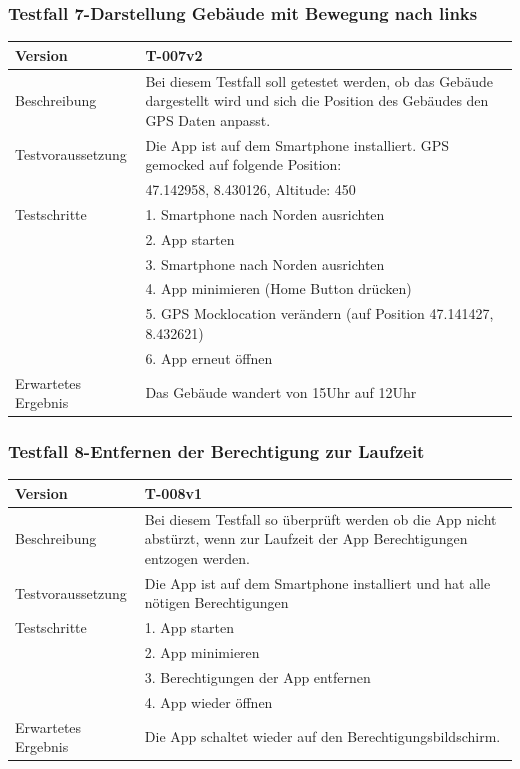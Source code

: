 \documentclass[a4paper]{scrreprt}
\begin{document}
\subsubsection{Testfall 7-Darstellung Gebäude mit Bewegung nach links}
\begin{tabularx}{\textwidth}{|l|X|}
\hline 
	Version &
	T-007v2 \\ 
\hline 
	Beschreibung & 
	Bei diesem Testfall soll getestet werden, ob das Gebäude dargestellt wird und sich die Position des Gebäudes den GPS Daten anpasst. \\ 
\hline 
	Testvoraussetzung &
	Die App ist auf dem Smartphone installiert. GPS gemocked auf folgende Position: \\ &
		47.142958, 8.430126, Altitude: 450 \\ 
\hline 
	Testschritte & 
		1. Smartphone nach Norden ausrichten \\ &
		2. App starten \\ &
		3. Smartphone nach Norden ausrichten \\ &
		4. App minimieren (Home Button drücken) \\ &
		5. GPS Mocklocation verändern (auf Position  47.141427, 8.432621) \\ &
		6. App erneut öffnen \\
\hline
	Erwartetes Ergebnis &
	Das Gebäude wandert von 15Uhr auf 12Uhr \\ 
\hline 
\end{tabularx}
\subsubsection{Testfall 8-Entfernen der Berechtigung zur Laufzeit}
\begin{tabularx}{\textwidth}{|l|X|}
\hline 
	Version &
	T-008v1 \\ 
\hline 
	Beschreibung & 
	Bei diesem Testfall so überprüft werden ob die App nicht abstürzt, wenn zur Laufzeit der App Berechtigungen entzogen werden. \\ 
\hline 
	Testvoraussetzung &
	Die App ist auf dem Smartphone installiert und hat alle nötigen Berechtigungen \\ 
\hline 
	Testschritte & 
		1. App starten \\ &
		2. App minimieren \\ &
		3. Berechtigungen der App entfernen \\ &
		4. App wieder öffnen \\
\hline
	Erwartetes Ergebnis &
	Die App schaltet wieder auf den Berechtigungsbildschirm. \\ 
\hline 
\end{tabularx}
\end{document}

